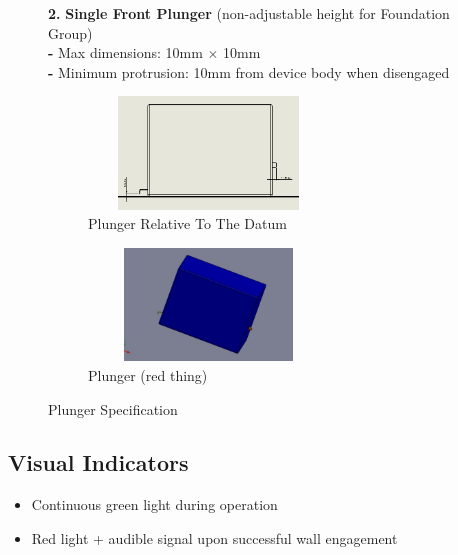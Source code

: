 \documentclass{article}
\newcommand{\wm}[2]{%
	\begin{minipage}{#1\textwidth}
		\centering
		#2
	\end{minipage}%
}
\begin{document}
\begin{itemize}[itemsep=-0.7mm]
	\begin{figure}[H]
	\begin{minipage}{0.4\textwidth}\vspace{-3em}	
	\centering\wm{0.7}{\item[\textbf{2.}] \textbf{Single Front Plunger} (non-adjustable height for Foundation Group)\\\textbf{-} Max dimensions: 10mm $\times$ 10mm\\
	\textbf{-} Minimum protrusion: 10mm from device body when disengaged}
	\end{minipage}\hspace{-2em}
	\begin{minipage}{0.7\textwidth}			
		\centering
		\begin{subfigure}[t]{0.45\textwidth}
			\centering
			\includegraphics[width=0.7\textwidth,height=3cm]{extracted_images/image_11_2.png}
			\caption{Plunger Relative To The Datum}
			\label{fig:plungerall}
		\end{subfigure}\hspace{-1em}
		\begin{subfigure}[t]{0.5\textwidth}
			\centering
			\includegraphics[width=0.7\textwidth,height=3cm]{extracted_images/image_11_1.png}
			\caption{Plunger (red thing)}
			\label{fig:plunger}
		\end{subfigure}
		\caption{Plunger Specification}
	\end{minipage}
	\end{figure}
\end{itemize}
\vspace*{-2em}
\subsection{Visual Indicators}
\begin{itemize}[noitemsep,topsep=0pt]
	\item Continuous green light during operation
	\item Red light + audible signal upon successful wall engagement
\end{itemize}
\end{document}
